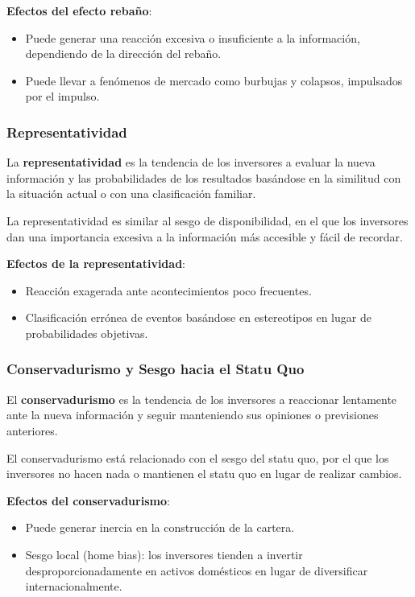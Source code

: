 \textbf{Efectos del efecto rebaño}:
\begin{itemize}
\item Puede generar una reacción excesiva o insuficiente a la información, dependiendo de la dirección del rebaño.
\item Puede llevar a fenómenos de mercado como burbujas y colapsos, impulsados por el impulso.
\end{itemize}

\subsubsection{Representatividad}

\begin{definicion}[Representatividad]
La \textbf{representatividad} es la tendencia de los inversores a evaluar la nueva información y las probabilidades de los resultados basándose en la similitud con la situación actual o con una clasificación familiar.
\end{definicion}

La representatividad es similar al sesgo de disponibilidad, en el que los inversores dan una importancia excesiva a la información más accesible y fácil de recordar.

\textbf{Efectos de la representatividad}:
\begin{itemize}
\item Reacción exagerada ante acontecimientos poco frecuentes.
\item Clasificación errónea de eventos basándose en estereotipos en lugar de probabilidades objetivas.
\end{itemize}

\subsubsection{Conservadurismo y Sesgo hacia el Statu Quo}

\begin{definicion}[Conservadurismo]
El \textbf{conservadurismo} es la tendencia de los inversores a reaccionar lentamente ante la nueva información y seguir manteniendo sus opiniones o previsiones anteriores.
\end{definicion}

El conservadurismo está relacionado con el sesgo del statu quo, por el que los inversores no hacen nada o mantienen el statu quo en lugar de realizar cambios.

\textbf{Efectos del conservadurismo}:
\begin{itemize}
\item Puede generar inercia en la construcción de la cartera.
\item Sesgo local (home bias): los inversores tienden a invertir desproporcionadamente en activos domésticos en lugar de diversificar internacionalmente.
\end{itemize}

